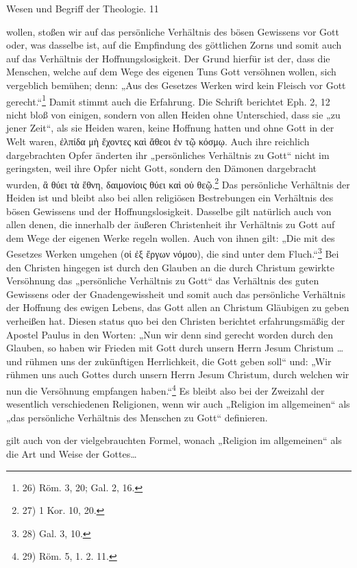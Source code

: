 \par\centering Wesen und Begriff der Theologie. \hfill 11\par{} wollen, stoßen wir auf das persönliche Verhältnis des bösen Gewissens vor Gott oder, was dasselbe ist, auf die Empfindung des göttlichen Zorns und somit auch auf das Verhältnis der Hoffnungslosigkeit. Der Grund hierfür ist der, dass die Menschen, welche auf dem Wege des eigenen Tuns Gott versöhnen wollen, sich vergeblich bemühen; denn: „Aus des Gesetzes Werken wird kein Fleisch vor Gott gerecht.“\footnote{26) Röm. 3, 20; Gal. 2, 16.} Damit stimmt auch die Erfahrung. Die Schrift berichtet Eph. 2, 12 nicht bloß von einigen, sondern von allen Heiden ohne Unterschied, dass sie „zu jener Zeit“, als sie Heiden waren, keine Hoffnung hatten und ohne Gott in der Welt waren, \textgreek{ἐλπίδα μὴ ἔχοντες καὶ ἄθεοι ἐν τῷ κόσμῳ}. Auch ihre reichlich dargebrachten Opfer änderten ihr „persönliches Verhältnis zu Gott“ nicht im geringsten, weil ihre Opfer nicht Gott, sondern den Dämonen dargebracht wurden, \textgreek{ἃ θύει τὰ ἔθνη, δαιμονίοις θύει καὶ οὐ θεῷ}.\footnote{27) 1 Kor. 10, 20.} Das persönliche Verhältnis der Heiden ist und bleibt also bei allen religiösen Bestrebungen ein Verhältnis des bösen Gewissens und der Hoffnungslosigkeit. Dasselbe gilt natürlich auch von allen denen, die innerhalb der äußeren Christenheit ihr Verhältnis zu Gott auf dem Wege der eigenen Werke regeln wollen. Auch von ihnen gilt: „Die mit des Gesetzes Werken umgehen (\textgreek{οἱ ἐξ ἔργων νόμου}), die sind unter dem Fluch.“\footnote{28) Gal. 3, 10.} Bei den Christen hingegen ist durch den Glauben an die durch Christum gewirkte Versöhnung das „persönliche Verhältnis zu Gott“ das Verhältnis des guten Gewissens oder der Gnadengewissheit und somit auch das persönliche Verhältnis der Hoffnung des ewigen Lebens, das Gott allen an Christum Gläubigen zu geben verheißen hat. Diesen status quo bei den Christen berichtet erfahrungsmäßig der Apostel Paulus in den Worten: „Nun wir denn sind gerecht worden durch den Glauben, so haben wir Frieden mit Gott durch unsern Herrn Jesum Christum \dots und rühmen uns der zukünftigen Herrlichkeit, die Gott geben soll“ und: „Wir rühmen uns auch Gottes durch unsern Herrn Jesum Christum, durch welchen wir nun die Versöhnung empfangen haben.“\footnote{29) Röm. 5, 1. 2. 11.} Es bleibt also bei der Zweizahl der wesentlich verschiedenen Religionen, wenn wir auch „Religion im allgemeinen“ als „das persönliche Verhältnis des Menschen zu Gott“ definieren.\par\nDasselbe gilt auch von der vielgebrauchten Formel, wonach „Religion im allgemeinen“ als die Art und Weise der Gottes\dots